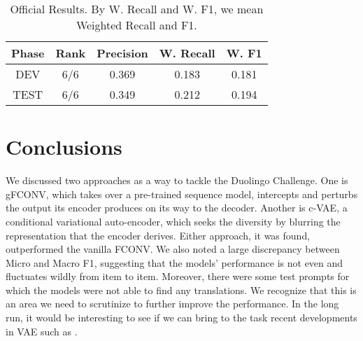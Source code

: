 \documentclass[dvipdfmx,11pt,a4paper]{article}
\begin{document}
\begin{table}
\caption{Official Results. By W. Recall and W. F1,  we mean Weighted Recall and F1. \label{tbl:results}}
\begin{tabular}{||ccccc||} \hline
Phase &Rank & Precision & W. Recall & W. F1 \\ \hline
DEV & 6/6 & 	0.369 & 0.183 & 0.181 \\
TEST & 6/6 & 0.349& 	0.212& 	0.194\\ \hline
\end{tabular}
\end{table}


\section{Conclusions}
We discussed two approaches as a way to tackle the Duolingo  Challenge. One is  gFCONV, which  takes over a pre-trained  sequence model, intercepts and perturbs the output its encoder produces on its way to the decoder.  Another is c-VAE,  a conditional variational auto-encoder, which seeks the diversity by blurring the representation that the encoder derives.
Either approach, it was found,  outperformed the vanilla FCONV.  We also noted a large discrepancy between Micro and Macro F1, suggesting that the models'  performance is not even and fluctuates wildly from item to item.  Moreover, there were some test prompts for which the models were not able to find any translations. We recognize that this is an  area we need to scrutinize to further improve the performance. In the long run, it would be interesting to see if we can  bring to the task  recent developments  in VAE such as  \cite{bouchacourt2018multi-level}.




\end{document}
